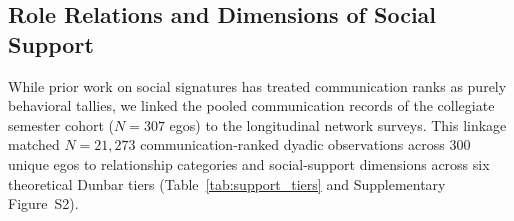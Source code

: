 \documentclass[11pt,letterpaper]{article}
\begin{document}
\subsection{Role Relations and Dimensions of Social Support}
While prior work on social signatures has treated communication ranks as purely behavioral tallies, we linked the pooled communication records of the collegiate semester cohort ($N = 307$ egos) to the longitudinal network surveys. This linkage matched $N = 21,273$ communication-ranked dyadic observations across 300 unique egos to relationship categories and social-support dimensions across six theoretical Dunbar tiers (Table~\ref{tab:support_tiers} and Supplementary Figure~S2).

\begin{table}[htbp]
\centering
\caption{Relational Composition and Support Functions Across Signature Rank Tiers ($N = 21,273$ Dyads)}
\label{tab:support_tiers}
\small
{}
\end{table}
\end{document}
